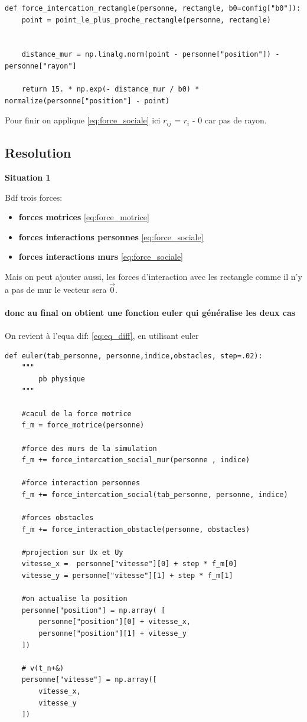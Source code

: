 \documentclass[a4paper,12pt]{article}
\begin{document}
\begin{verbatim}
def force_intercation_rectangle(personne, rectangle, b0=config["b0"]):
    point = point_le_plus_proche_rectangle(personne, rectangle)
    
    
    distance_mur = np.linalg.norm(point - personne["position"]) - personne["rayon"]

    return 15. * np.exp(- distance_mur / b0) * normalize(personne["position"] - point)
\end{verbatim}

Pour finir on applique \eqref{eq:force_sociale} ici $r_{ij}$ = $r_i$ - 0 car pas de rayon.

\subsection{Resolution}

\textbf{Situation 1}

Bdf trois forces:
\begin{itemize}
	\item \textbf{forces motrices} \eqref{eq:force_motrice}
	\item \textbf{forces interactions personnes} \eqref{eq:force_sociale}
	\item \textbf{forces interactions murs} \eqref{eq:force_sociale}
\end{itemize}
Mais on peut ajouter aussi, les forces d'interaction avec les rectangle comme il n'y a pas de mur le vecteur sera $\vec{0}$.
\\
\\
\textbf{donc au final on obtient une fonction euler qui généralise les deux cas}
\\
\\
On revient à l'equa dif: \eqref{eq:eq_diff}, en utilisant euler 
\begin{verbatim}
def euler(tab_personne, personne,indice,obstacles, step=.02):
    """
        pb physique 
    """

    #cacul de la force motrice
    f_m = force_motrice(personne)

    #force des murs de la simulation
    f_m += force_intercation_social_mur(personne , indice)

    #force interaction personnes
    f_m += force_intercation_social(tab_personne, personne, indice)

    #forces obstacles
    f_m += force_interaction_obstacle(personne, obstacles)

    #projection sur Ux et Uy
    vitesse_x =  personne["vitesse"][0] + step * f_m[0]
    vitesse_y = personne["vitesse"][1] + step * f_m[1]

    #on actualise la position
    personne["position"] = np.array( [
        personne["position"][0] + vitesse_x,
        personne["position"][1] + vitesse_y 
    ])

    # v(t_n+&)
    personne["vitesse"] = np.array([
        vitesse_x,
        vitesse_y
    ])
\end{verbatim}
\end{document}
